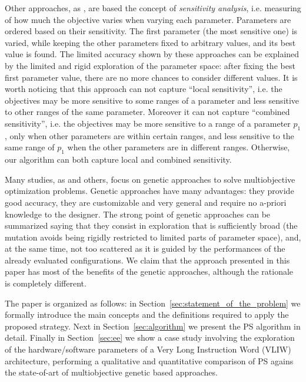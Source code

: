 Other approaches, as \cite{fornaciari_codes01,palesi_iwsoc02}, are based the concept of \emph{sensitivity analysis}, i.e. measuring of how much the objective varies when varying each parameter.
Parameters are ordered based on their sensitivity. The first parameter (the most sensitive one) is varied, while keeping the other parameters fixed to arbitrary values, and its best value is found. The limited accuracy shown by these approaches can be explained by the limited and rigid exploration of the parameter
space: after fixing the best first parameter value, there are no more chances to consider different values. It is worth noticing that this approach can not capture
``local sensitivity'', i.e. the objectives may be more sensitive to some
ranges of a parameter and less sensitive to other ranges of the same
parameter. Moreover it can not capture ``combined sensitivity'', i.e. the objectives may be
more sensitive to a range of a parameter $p_{1}$, only when other
parameters are within certain ranges, and less sensitive to the same
range of $p_{1}$ when the other parameters are in different ranges. Otherwise, our algorithm can both capture local and combined sensitivity.


Many studies, as \cite{coello_easmop} and others, focus on genetic approaches to solve multiobjective
optimization problems. Genetic approaches
have many advantages: they provide good accuracy, they are customizable and very general
and require no a-priori knowledge to the designer.  The strong
point of genetic approaches can be summarized saying that they consist
in exploration that is sufficiently broad (the mutation avoids being rigidly restricted to limited parts of parameter space), and, at the same time, not too scattered as it is guided by the performances of
the already evaluated configurations. We claim that the
approach presented in this paper has most of the benefits of the genetic
approaches, although the rationale is completely different.

The paper is organized as follows: in
Section~\ref{sec:statement_of_the_problem} we formally introduce the
main concepts and the definitions required to apply the proposed strategy. Next in
Section~\ref{sec:algorithm} we present the PS algorithm in detail.
Finally in Section~\ref{sec:ee} we show a case study involving the
exploration of the hardware/software parameters of a Very Long
 Instruction Word (VLIW) architecture, performing a qualitative
 and quantitative comparison of
PS agains the state-of-art of multiobjective genetic based approaches.

